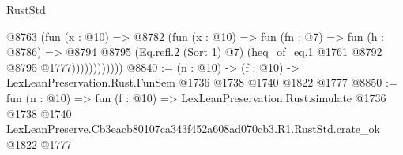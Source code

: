 \begin{lexlean}{RustStd}
\begin{coremodule}
                    @8763
                      (fun (x : @10) =>
                      @8782
                        (fun (x : @10) =>
                        fun (fn : @7) =>
                        fun (h : @8786) =>
                        @8794
                          @8795
                          (Eq.refl.{2} (Sort 1) @7)
                          (heq_of_eq.{1} @1761 @8792 @8795 @1777))))))))))))
@8840 := (n : @10) -> (f : @10) -> LexLeanPreservation.Rust.FunSem @1736 @1738 @1740 @1822 @1777
@8850 := fun (n : @10) =>
  fun (f : @10) =>
  LexLeanPreservation.Rust.simulate
    @1736
    @1738
    @1740
    LexLeanPreserve.Cb3eacb80107ca343f452a608ad070cb3.R1.RustStd.crate_ok
    @1822
    @1777
\end{coremodule}
\end{lexlean}
